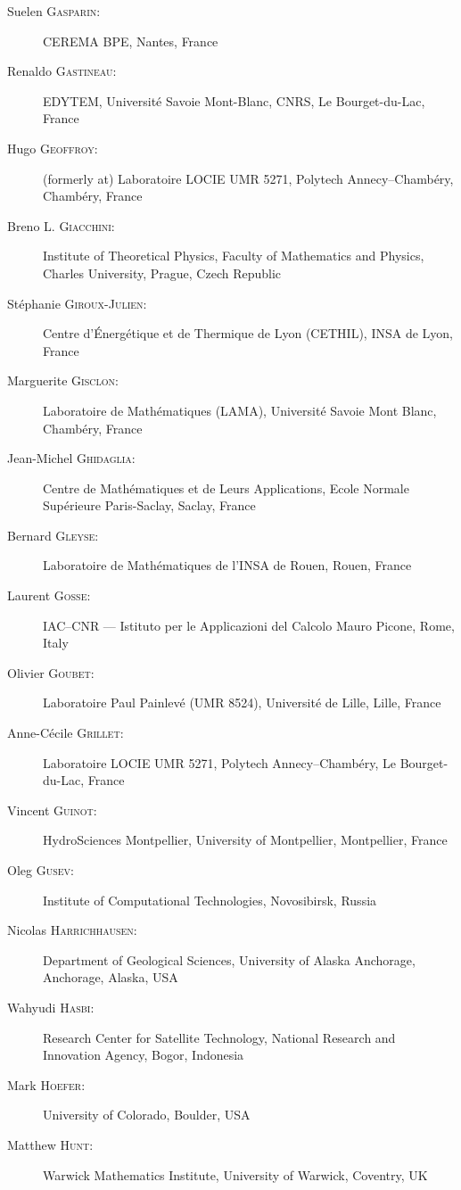 \begin{description}
  \item[Suelen \textsc{Gasparin}:] CEREMA BPE, Nantes, France
  \item[Renaldo \textsc{Gastineau}:] EDYTEM, Universit\'e Savoie Mont-Blanc, CNRS, Le Bourget-du-Lac, France
  \item[Hugo \textsc{Geoffroy}:] (formerly at) Laboratoire LOCIE UMR 5271, Polytech Annecy--Chamb\'ery, Chamb\'ery, France
  \item[Breno L. \textsc{Giacchini}:] Institute of Theoretical Physics, Faculty of Mathematics and Physics, Charles University, Prague, Czech Republic
  \item[St\'ephanie \textsc{Giroux-Julien}:] Centre d'\'Energ\'etique et de Thermique de Lyon (CETHIL), INSA de Lyon, France
  \item[Marguerite \textsc{Gisclon}:] Laboratoire de Math\'ematiques (LAMA), Universit\'e Savoie Mont Blanc, Chamb\'ery, France
  \item[Jean-Michel \textsc{Ghidaglia}:] Centre de Math\'ematiques et de Leurs Applications, Ecole Normale Sup\'erieure Paris-Saclay, Saclay, France
  \item[Bernard \textsc{Gleyse}:] Laboratoire de Math\'ematiques de l'INSA de Rouen, Rouen, France
  \item[Laurent \textsc{Gosse}:] IAC--CNR --- Istituto per le Applicazioni del Calcolo Mauro Picone, Rome, Italy
  \item[Olivier \textsc{Goubet}:] Laboratoire Paul Painlev\'e (UMR 8524), Universit\'e de Lille, Lille, France
  \item[Anne-C\'ecile \textsc{Grillet}:] Laboratoire LOCIE UMR 5271, Polytech Annecy--Chamb\'ery, Le Bourget-du-Lac, France
  \item[Vincent \textsc{Guinot}:] HydroSciences Montpellier, University of Montpellier, Montpellier, France
  \item[Oleg \textsc{Gusev}:] Institute of Computational Technologies, Novosibirsk, Russia
  \item[Nicolas \textsc{Harrichhausen}:] Department of Geological Sciences, University of Alaska Anchorage, Anchorage, Alaska, USA
  \item[Wahyudi \textsc{Hasbi}:] Research Center for Satellite Technology, National Research and Innovation Agency, Bogor, Indonesia
  \item[Mark \textsc{Hoefer}:] University of Colorado, Boulder, USA
  \item[Matthew \textsc{Hunt}:] Warwick Mathematics Institute, University of Warwick, Coventry, UK

\end{description}
